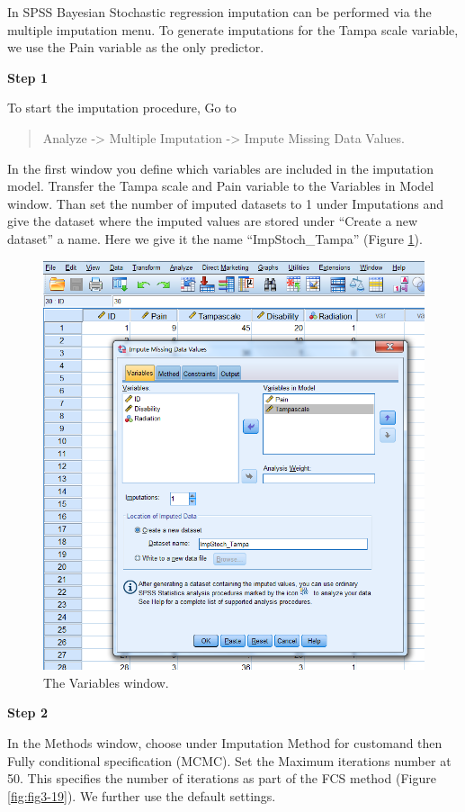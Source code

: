 \documentclass[]{book}
\theoremstyle{definition}
\theoremstyle{definition}
\theoremstyle{definition}
\theoremstyle{remark}
\begin{document}
In SPSS Bayesian Stochastic regression imputation can be performed via
the multiple imputation menu. To generate imputations for the Tampa
scale variable, we use the Pain variable as the only predictor.

\textbf{Step 1}

To start the imputation procedure, Go to

\begin{quote}
Analyze -\textgreater{} Multiple Imputation -\textgreater{} Impute
Missing Data Values.
\end{quote}

In the first window you define which variables are included in the
imputation model. Transfer the Tampa scale and Pain variable to the
Variables in Model window. Than set the number of imputed datasets to 1
under Imputations and give the dataset where the imputed values are
stored under ``Create a new dataset'' a name. Here we give it the name
``ImpStoch\_Tampa'' (Figure \ref{fig:fig3-18}).

\begin{figure}

{\centering \includegraphics[width=0.7\linewidth]{images/fig3.18} 

}

\caption{The Variables window.}\label{fig:fig3-18}
\end{figure}

\textbf{Step 2}

In the Methods window, choose under Imputation Method for customand then
Fully conditional specification (MCMC). Set the Maximum iterations
number at 50. This specifies the number of iterations as part of the FCS
method (Figure \ref{fig:fig3-19}). We further use the default settings.
\end{document}
